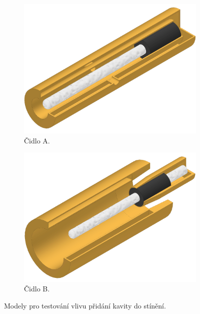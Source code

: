         \begin{figure}[ht!]
            \centering
            \begin{subfigure}{0.45\textwidth}
                \centering
                \includegraphics[width=\textwidth]{400_SIMULACE_KONSTRUKCNICH_UPRAV/Vykresy_rendery/Kavita.png}
                \caption{Čidlo A.}
                \label{fig:kavita-A}
            \end{subfigure}
            \begin{subfigure}{0.45\textwidth}
                \centering
                \includegraphics[width=\textwidth]{400_SIMULACE_KONSTRUKCNICH_UPRAV/Vykresy_rendery/Kavita_B.png}
                \caption{Čidlo B.}
                \label{fig:kavita-B}
            \end{subfigure}
            \caption{Modely pro testování vlivu přidání kavity do stínění.}
            \label{fig:kavita-modely}
        \end{figure}
        
